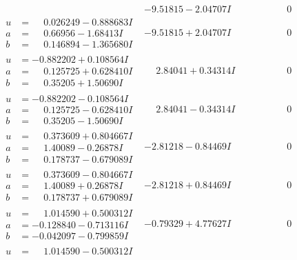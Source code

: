 \documentclass[1p]{elsarticle_modified}
\theoremstyle{definition}
\begin{document}
$$\begin{array}{c|c|c}
 & -9.51815 - 2.04707 I & \phantom{-0.000000 } 0 \\ \hline\begin{aligned}
u &= \phantom{-}0.026249 - 0.888683 I \\
a &= \phantom{-}0.66956 - 1.68413 I \\
b &= \phantom{-}0.146894 - 1.365680 I\end{aligned}
 & -9.51815 + 2.04707 I & \phantom{-0.000000 } 0 \\ \hline\begin{aligned}
u &= -0.882202 + 0.108564 I \\
a &= \phantom{-}0.125725 + 0.628410 I \\
b &= \phantom{-}0.35205 + 1.50690 I\end{aligned}
 & \phantom{-}2.84041 + 0.34314 I & \phantom{-0.000000 } 0 \\ \hline\begin{aligned}
u &= -0.882202 - 0.108564 I \\
a &= \phantom{-}0.125725 - 0.628410 I \\
b &= \phantom{-}0.35205 - 1.50690 I\end{aligned}
 & \phantom{-}2.84041 - 0.34314 I & \phantom{-0.000000 } 0 \\ \hline\begin{aligned}
u &= \phantom{-}0.373609 + 0.804667 I \\
a &= \phantom{-}1.40089 - 0.26878 I \\
b &= \phantom{-}0.178737 - 0.679089 I\end{aligned}
 & -2.81218 - 0.84469 I & \phantom{-0.000000 } 0 \\ \hline\begin{aligned}
u &= \phantom{-}0.373609 - 0.804667 I \\
a &= \phantom{-}1.40089 + 0.26878 I \\
b &= \phantom{-}0.178737 + 0.679089 I\end{aligned}
 & -2.81218 + 0.84469 I & \phantom{-0.000000 } 0 \\ \hline\begin{aligned}
u &= \phantom{-}1.014590 + 0.500312 I \\
a &= -0.128840 - 0.713116 I \\
b &= -0.042097 - 0.799859 I\end{aligned}
 & -0.79329 + 4.77627 I & \phantom{-0.000000 } 0 \\ \hline\begin{aligned}
u &= \phantom{-}1.014590 - 0.500312 I \\

\end{aligned}
\end{array}$$
\end{document}
